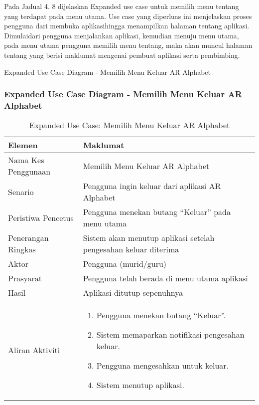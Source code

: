 \begin{itemize}
\begin{itemize}
\begin{itemize}
\begin{itemize}
\begin{itemize}
\begin{itemize}
\begin{itemize}
\begin{itemize}
\begin{flushleft}
Pada Jadual  4. 8 dijelaskan Expanded use case untuk memilih menu tentang
yang terdapat pada menu utama. Use case yang diperluas ini menjelaskan proses  pengguna dari membuka aplikasihingga menampilkan halaman tentang aplikasi.
Dimulaidari pengguna menjalankan aplikasi, kemudian menuju menu utama, pada menu utama pengguna memilih menu tentang, maka akan muncul halaman tentang yang berisi maklumat mengenai pembuat aplikasi serta pembimbing.

 Expanded Use Case Diagram - Memilih Menu Keluar AR Alphabet




\subsubsection{Expanded Use Case Diagram - Memilih Menu Keluar AR Alphabet}





\begin{table}[htbp]
\centering
\caption{Expanded Use Case: Memilih Menu Keluar AR Alphabet}
\begin{tabular}{lp{10cm}}
\toprule
\textbf{Elemen} & \textbf{Maklumat} \\
\midrule
Nama Kes Penggunaan & Memilih Menu Keluar AR Alphabet \\
Senario & Pengguna ingin keluar dari aplikasi AR Alphabet \\
Peristiwa Pencetus & Pengguna menekan butang “Keluar” pada menu utama \\
Penerangan Ringkas & Sistem akan menutup aplikasi setelah pengesahan keluar diterima \\
Aktor & Pengguna (murid/guru) \\
Prasyarat & Pengguna telah berada di menu utama aplikasi \\
Hasil & Aplikasi ditutup sepenuhnya \\
Aliran Aktiviti & 
\begin{enumerate}
    \item Pengguna menekan butang “Keluar”.
    \item Sistem memaparkan notifikasi pengesahan keluar.
    \item Pengguna mengesahkan untuk keluar.
    \item Sistem menutup aplikasi.
\end{enumerate} \\
\bottomrule
\end{tabular}
\label{jadual:expanded_menu_keluar}
\end{table}



\end{flushleft}
\end{itemize}
\end{itemize}
\end{itemize}
\end{itemize}
\end{itemize}
\end{itemize}
\end{itemize}
\end{itemize}

